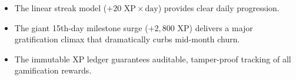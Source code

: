 \begin{tcolorbox}[summarybox, title={Chapter Key Takeaways}]
\begin{itemize}
    \item The linear streak model ($+20\text{ XP} \times \text{day}$) provides clear daily progression.
    \item The giant 15th-day milestone surge ($+2,800\text{ XP}$) delivers a major gratification climax that dramatically curbs mid-month churn.
    \item The immutable XP ledger guarantees auditable, tamper-proof tracking of all gamification rewards.
\end{itemize}
\end{tcolorbox}
